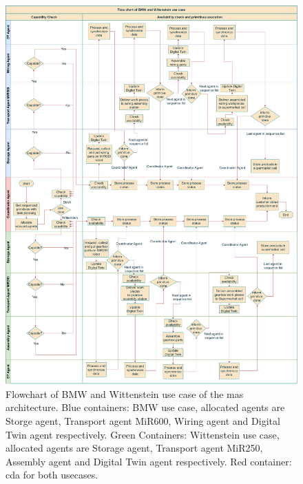 \begin{figure}[htb]
    \includegraphics[width=\textwidth]{figures/tests/usecase/Usecase_flow.pdf}\hfill 
    \caption{Flowchart of BMW and Wittenstein use case of the \gls{mas} architecture. 
    Blue containers: BMW use case, allocated agents are Storge agent, 
    Transport agent MiR600, Wiring agent and Digital Twin agent respectively. 
    Green Containers: Wittenstein use case, allocated agents are Storage agent, 
    Transport agent MiR250, Assembly agent and Digital Twin agent respectively. 
    Red container: \gls{cda} for both usecases.} 
    \label{fig: Flowchart-usecase}
\end{figure}



